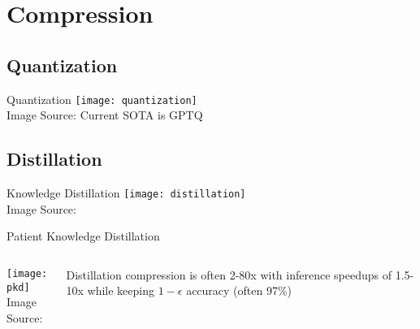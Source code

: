\section{Compression}
\subsection{Quantization}
\begin{frame}[c]{Quantization}
    \texttt{[image: quantization]} \\
    Image Source: \cite{seo_efficient_2019}
    \large
    Current SOTA is GPTQ \cite{frantar_gptq_2022}
\end{frame}

\subsection{Distillation}
\begin{frame}[c]{Knowledge Distillation}
    \texttt{[image: distillation]} \\
    Image Source: \cite{gou_knowledge_2021}
\end{frame}

\begin{frame}[c]{Patient Knowledge Distillation}
    \begin{columns}
        \begin{minipage}[c][\textheight][c]{\linewidth}
            \texttt{[image: pkd]} \\
            Image Source: \cite{sun_patient_2019}
        \end{minipage}
        \large
        \begin{minipage}[c][\textheight][c]{\linewidth}
            Distillation compression is often 2-80x with inference
            speedups of 1.5-10x while keeping $1-\epsilon$ accuracy (often
            97\%)
        \end{minipage}
    \end{columns}
\end{frame}

